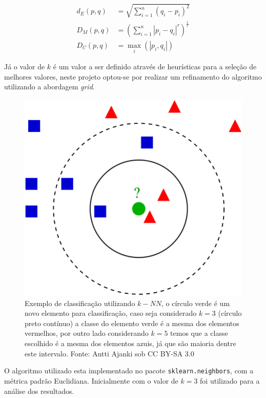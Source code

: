 \documentclass[
	article,			%
	11pt,				%
	oneside,			%
	a4paper,			%
	english,			%
	brazil,				%
	sumario=tradicional
	]{abntex2}
\begin{document}
\begin{align}
 \label{eq: dist1}
  d_E\left( p,q\right)&= \sqrt {\sum _{i=1}^{n}  \left( q_{i}-p_{i}\right)^2 } \\
  \label{eq: dist2}
  D_M\left( p,q\right)&= \left( \sum_{i=1}^{n} \left| p_i - q_i \right|^r \right)^{\frac{1}{r}} 
  \\
  \label{eq: dist3}
  D_C\left( p,q\right)&= \max_i(|p_i,q_i|) 
\end{align}

Já o valor de $k$ é um valor a ser definido através de heurísticas para a seleção de melhores valores, neste projeto optou-se por realizar um refinamento do algoritmo utilizando a abordagem \textit{grid}.

\begin{figure}[h!]
 \centering
 \includegraphics[scale=0.2]{fig/knn_alg.png}
 \caption{Exemplo de classificação utilizando $k-NN$, o círculo verde é um novo elemento para classificação, caso seja considerado $k=3$ (círculo preto contínuo) a classe do elemento verde é a mesma dos elementos vermelhos, por outro lado considerando $k=5$ temos que a classe escolhido é a mesma dos elementos azuis, já que são maioria dentre este intervalo. Fonte: Antti Ajanki sob CC BY-SA 3.0}
 \label{fig:knn_alg}
\end{figure}

O algoritmo utilizado esta implementado no pacote \verb|sklearn.neighbors|, com a métrica padrão Euclidiana. Inicialmente com o valor de $k=3$ foi utilizado para a análise dos resultados.
\end{document}
